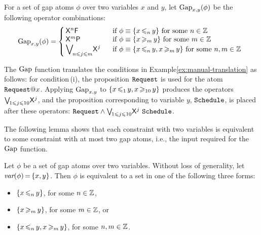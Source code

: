 \begin{deff}
  For a set of gap atoms $\phi$ over two variables $x$ and $y$,
  let $\Gap_{x,y}(\phi)$
  be the following operator combinations:
  \[
  \Gap_{x,y}(\phi) = \left\{
  \begin{array}{@{\,}l@{\hspace*{6mm}}l}
    {\sf X}^{n} {\sf F\ } &
    \mbox{if }
        \phi\equiv \{x \tight{\leq_n} y\}
        \mbox{ for some $n\in\Z$}
    \\
    {\sf X}^{m} {\sf P} &
    \mbox{if } \phi \equiv \{ x \tight{\geq_m} y\}
    \mbox{ for some $m\in\Z$}
    \\
    \displaystyle {\bigvee}_{\!n \leq j \leq m}{\sf X}^{j} &
    \mbox{if } \phi \equiv
      \{ x \tight{\leq_n} y, x \tight{\geq_m}y\}
      \mbox{ for some $n,m\in\Z$}
  \end{array}\right.
  \]
  \vspace{-2em}
\end{deff}

The $\Gap$ function translates
the conditions in Example\:\ref{ex:manual-translation} as follows:
for condition\,(i),
the proposition $\Request$ is used for the atom $\Request@x$.
Applying $\Gap_{x,y}$ to
$\{x\tight{\leq_1} y, x\tight{\geq_{10}} y\}$
produces the operators
$\bigvee_{\!1\leq j\leq 10}\!{\sf X}^j$,
and the proposition corresponding
to variable $y$, $\Schedule$, is placed after these operators: $\Request\land\bigvee_{\!1\leq j\leq 10}\!{\sf X}^j\ \Schedule$.  

The following lemma shows that
each constraint with two variables
is equivalent to some constraint with at most two gap atoms,
i.e., the input required for the $\Gap$ function.

\begin{lemma}\label{lemma:redundant-atoms}
  Let $\phi$ be a set of gap atoms over two variables.
  Without loss of generality, let $\var(\phi)\tight=\{x,y\}$.
  Then $\phi$ is equivalent to
  a set in one of the following three forms:
  \begin{itemize}
  \item
    $\{x \tight{\leq_n} y\}$, for some $n\in\Z$,
  \item
    $\{x \tight{\geq_m} y\}$, for some $m\in\Z$, or
  \item
    $\{x \tight{\leq_n} y, x \tight{\geq_m}y\}$, for some $n,m\in\Z$.
  \end{itemize}
\end{lemma}

